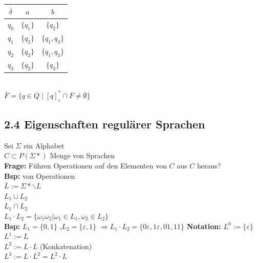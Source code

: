 \documentclass[10pt]{article}
\newcommand{\Bold}[1]{\textbf{#1}} %
\begin{document}
\begin{tabular}{c|c|c}
 $\overline{\delta}$&$a$&$b$\\\hline
 $q_0$&$\{q_1\}$&$\{q_2\}$\\
 $q_1$&$\{q_2\}$&$\{q_1,q_3\}$\\
 $q_2$&$\{q_2\}$&$\{q_1,q_3\}$\\
 $q_3$&$\{q_2\}$&$\{q_3\}$
\end{tabular}\\
$\overline{F}=\{q\in Q\mid [q]_\varepsilon^*\cap F\neq \emptyset\}$
\subsection{2.4 Eigenschaften regul\"arer Sprachen}
Sei $\Sigma$ ein Alphabet\\
$C\subset P(\Sigma*)$ Menge von Sprachen\\
\Bold{Frage:} F\"uhren Operationen auf den Elementen von $C$ aus $C$ heraus?\\
\Bold{Bsp:} von Operationen\\
$\overline{L}:=\Sigma*\backslash L$\\
$L_1\cup L_2$\\
$L_1 \cap L_2$\\
$L_1\cdot L_2=\{\omega_1\omega_2|\omega_1\in L_1,\omega_2\in L_2\}$\\
\Bold{Bsp:} $L_1 =\{0,1\}$ ,$L_2 =\{\varepsilon,1\}$ $\Rightarrow L_1\cdot L_2 = \{0\varepsilon, 1\varepsilon,01,11\}$
\Bold{Notation:}
$L^0:=\{\varepsilon\}$\\
$L^1:= L$\\
$L^2:= L\cdot L$ (Konkatenation)\\ 
$L^3:= L\cdot L^2 = L^2\cdot L$
\end{document}
